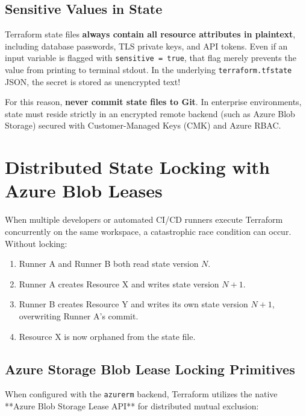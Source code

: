 \subsection{Sensitive Values in State}
\begin{productionwarningbox}
Terraform state files \textbf{always contain all resource attributes in plaintext}, including database passwords, TLS private keys, and API tokens. Even if an input variable is flagged with \texttt{sensitive = true}, that flag merely prevents the value from printing to terminal stdout. In the underlying \texttt{terraform.tfstate} JSON, the secret is stored as unencrypted text! 

For this reason, \textbf{never commit state files to Git}. In enterprise environments, state must reside strictly in an encrypted remote backend (such as Azure Blob Storage) secured with Customer-Managed Keys (CMK) and Azure RBAC.
\end{productionwarningbox}

\section{Distributed State Locking with Azure Blob Leases}

When multiple developers or automated CI/CD runners execute Terraform concurrently on the same workspace, a catastrophic race condition can occur. Without locking:
\begin{enumerate}[leftmargin=15pt]
  \item Runner A and Runner B both read state version $N$.
  \item Runner A creates Resource X and writes state version $N+1$.
  \item Runner B creates Resource Y and writes its own state version $N+1$, overwriting Runner A's commit.
  \item Resource X is now orphaned from the state file.
\end{enumerate}

\subsection{Azure Storage Blob Lease Locking Primitives}
When configured with the \texttt{azurerm} backend, Terraform utilizes the native **Azure Blob Storage Lease API** for distributed mutual exclusion:

